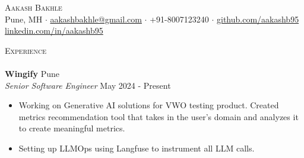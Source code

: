 \documentclass[a4paper]{article}
\newcommand{\lineunder} {
    \vspace*{-8pt} \\
    \hspace*{-18pt} \hrulefill \\
}
\newcommand{\header} [1] {
    {\hspace*{-18pt}\vspace*{6pt} \textsc{#1}}
    \vspace*{-6pt} \lineunder
}
\begin{document}
\vspace*{-40pt}



\vspace*{-10pt}
\begin{center}
    {\Huge \scshape {Aakash Bakhle}}\\
    Pune, MH $\cdot$ \href{mailto:aakashbakhle@gmail.com}{aakashbakhle@gmail.com} $\cdot$ +91-8007123240 $\cdot$ \href{https://github.com/aakashb95}{github.com/aakashb95} \href{http://www.linkedin.com/in/aakashb95}{linkedin.com/in/aakashb95}\\
\end{center}


\header{Experience}
\vspace{1mm}
\textbf{Wingify} \hfill Pune\\
\textit{Senior Software Engineer} \hfill May 2024 - Present\\
\vspace{-1mm}
\begin{itemize} \itemsep 1pt
    \item Working on Generative AI solutions for VWO testing product. Created metrics recommendation tool that takes in the user's domain and analyzes it to create meaningful metrics.
    \item Setting up LLMOps using Langfuse to instrument all LLM calls.
\end{itemize}

\vspace*{2mm}
\end{document}
